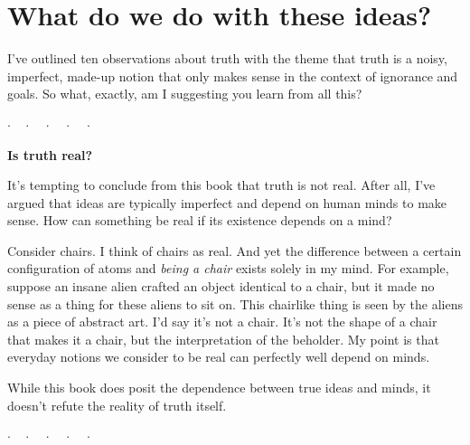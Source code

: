 \documentclass[9pt, twoside]{book}
\theoremstyle{argtstyle}
\newcommand{\dotq}{\cdot\quad}
\newcommand{\scenebreak}{
    \medskip\centerline{$\dotq\dotq\dotq\dotq\cdot$}\medskip
}
\begin{document}

\section{What do we do with these ideas?}

I've outlined ten observations about truth with the theme that
truth is a noisy, imperfect, made-up notion that only makes sense in the context
of ignorance and goals. So what, exactly, am I suggesting you learn from
all this?

\scenebreak

\noindent
{\bf Is truth real?}

It's tempting to conclude from this book that truth is not real.
After all, I've argued that ideas are typically imperfect and depend on
human minds to make sense. How can something be real if its existence depends on
a mind?

Consider chairs. I think of chairs as real. And yet the difference between a
certain configuration of atoms and {\em being a chair} exists solely in my mind.
For example, suppose an insane alien crafted an object identical to a chair,
but it made no sense as a thing for these aliens to sit on.
This chairlike thing
is seen by the aliens as a piece of abstract art.
I'd say it's not a chair.
It's not the shape of a
chair that makes it a chair, but the interpretation of the beholder.
My point is that everyday notions we consider to be real can perfectly well
depend on minds.

While this book does posit the dependence between
true ideas and minds, it doesn't refute the reality of truth itself.

\scenebreak
\end{document}
